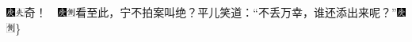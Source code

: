 {{{}\includegraphics[width=3mm]{../Images/00004}\includegraphics[width=3mm]{../Images/00012}\footnotesize \kaishu 奇！　{\includegraphics[width=3mm]{../Images/00004}\includegraphics[width=3mm]{../Images/00011}\footnotesize \kaishu 看至此，宁不拍案叫绝？}}平儿笑道：“不丢万幸，谁还添出来呢？”{\includegraphics[width=3mm]{../Images/00004}\includegraphics[width=3mm]{../Images/00011}\footnotesize \}}}
